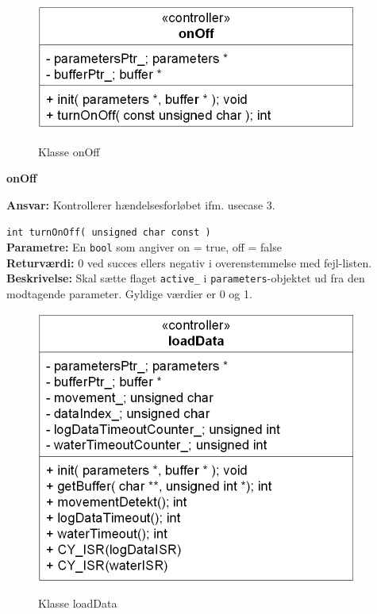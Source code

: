 \begin{figure}[htbp] \centering
{\includegraphics[scale=1.3]{filer/design/Klassediagrammer/sw_psoc_onOff}}
\caption{Klasse onOff}
\label{fig:sw_psoc_class_onOff}
\end{figure} 

{\centering
\textbf{onOff}\par
}
\textbf{Ansvar:} Kontrollerer hændelsesforløbet ifm. usecase 3. \

\verb+int turnOnOff( unsigned char const )+ \\
\textbf{Parametre:} En \verb+bool+ som angiver on = true, off = false \\
\textbf{Returværdi:} 0 ved succes ellers negativ i overenstemmelse med fejl-listen. \\
\textbf{Beskrivelse:} Skal sætte flaget \verb+active_+ i \verb+parameters+-objektet ud fra den modtagende parameter. Gyldige værdier er 0 og 1.\\

\begin{figure}[htbp] \centering
{\includegraphics[scale=1.3]{filer/design/Klassediagrammer/sw_psoc_loadData}}
\caption{Klasse loadData}
\label{fig:sw_psoc_class_loadData}
\end{figure} 

